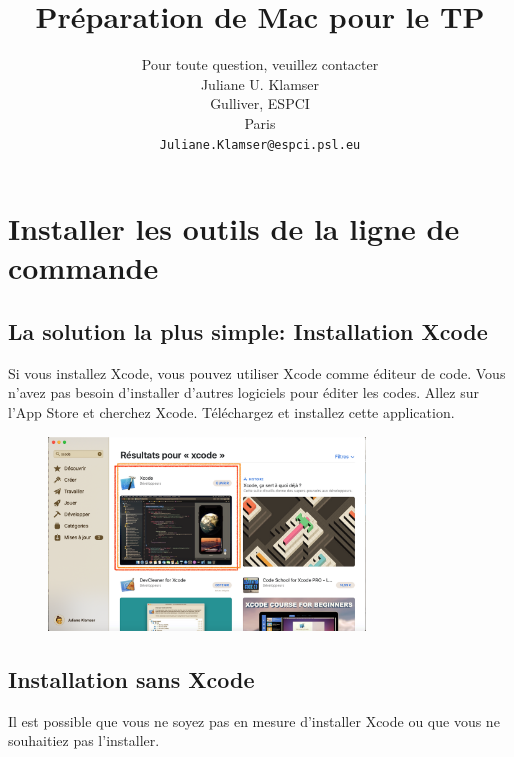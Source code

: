 \documentclass{article}
\title{Préparation de Mac pour le TP}
\author{
Pour toute question, veuillez contacter\\
 Juliane U. Klamser\\%
  Gulliver,  ESPCI\\
  Paris \\
  \texttt{Juliane.Klamser@espci.psl.eu} \\
}
\begin{document}
\maketitle

\tableofcontents



\section{Installer les outils de la ligne de commande}
\subsection{La solution la plus simple: Installation Xcode}
Si vous installez Xcode, vous pouvez utiliser Xcode comme éditeur de code. Vous n'avez pas besoin d'installer d'autres logiciels pour éditer les codes.
Allez sur l'App Store et cherchez Xcode. Téléchargez et installez cette application.
\begin{figure}[H]
\center
\includegraphics[width=0.75\textwidth]{Plots/AppStoreXcode.png}
\end{figure}
\subsection{Installation sans Xcode}
Il est possible que vous ne soyez pas en mesure d'installer Xcode ou que vous ne souhaitiez pas l'installer.  
\end{document}
